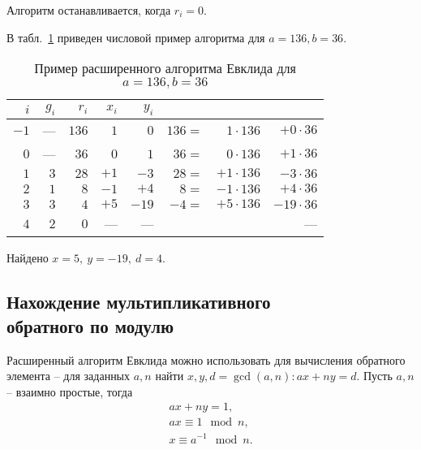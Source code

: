 Алгоритм останавливается, когда $r_i = 0$.


\example
В табл.~\ref{tab:extended-euclid} приведен числовой пример алгоритма для $a=136, b=36$.
\begin{table}[!ht]
    \centering
    \caption{Пример расширенного алгоритма Евклида для \\ $a=136, b=36$\label{tab:extended-euclid}}
    \begin{tabular}{|r|r|r|r|r|rrr|}
        \hline
        $i$ & $g_i$ & $r_i$ & $x_i$ & $y_i$ & & & \\
        \hline
        $-1$ &  --- & $136$ &   $1$ &   $0$ & $136 =$ & $ 1 \cdot 136$ & $ + 0 \cdot 36$ \\
	 $0$ &  --- &  $36$ &   $0$ &   $1$ &  $36 =$ & $ 0 \cdot 136$ & $ + 1 \cdot 36$ \\
	 $1$ &  $3$ &  $28$ &  $+1$ &  $-3$ &  $28 =$ & $+1 \cdot 136$ & $ - 3 \cdot 36$ \\
	 $2$ &  $1$ &   $8$ &  $-1$ &  $+4$ &   $8 =$ & $-1 \cdot 136$ & $ + 4 \cdot 36$ \\
	 $3$ &  $3$ &   $4$ &  $+5$ & $-19$ &  $-4 =$ & $+5 \cdot 136$ & $- 19 \cdot 36$ \\
	 $4$ &  $2$ &   $0$ &   --- &   --- & & & --- \\
        \hline
    \end{tabular}
\end{table}
Найдено $x = 5, ~ y = -19, ~ d = 4$.
\exampleend

\subsection[Нахождение мультипликативного обратного]{Нахождение мультипликативного \protect\\ обратного по модулю}

Расширенный алгоритм Евклида можно использовать для вычисления обратного элемента -- для заданных $a, n$ найти $x, y, d = \gcd(a,n): ax + ny = d$. Пусть $a,n$ -- взаимно простые, тогда
\[\begin{array}{l}
	ax + ny = 1, \\
	ax \equiv 1 \mod n, \\
	x \equiv a^{-1} \mod n. \\
\end{array}\]

